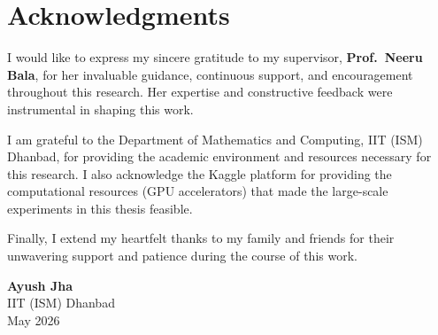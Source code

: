 \documentclass[11pt, a4paper, twoside, openany]{book}
\makeatletter
\def\cleardoublepage{\clearpage\if@twoside \ifodd\c@page\else
    \thispagestyle{empty}
    \hbox{}\newpage\fi\fi}
\makeatother
\begin{document}


\chapter*{Acknowledgments}
I would like to express my sincere gratitude to my supervisor, \textbf{Prof.\ Neeru Bala}, for her invaluable guidance, continuous support, and encouragement throughout this research. Her expertise and constructive feedback were instrumental in shaping this work.

I am grateful to the Department of Mathematics and Computing, IIT (ISM) Dhanbad, for providing the academic environment and resources necessary for this research. I also acknowledge the Kaggle platform for providing the computational resources (GPU accelerators) that made the large-scale experiments in this thesis feasible.

Finally, I extend my heartfelt thanks to my family and friends for their unwavering support and patience during the course of this work.

\vspace{1cm}
\noindent
\textbf{Ayush Jha}\\
IIT (ISM) Dhanbad\\
May 2026

\clearpage


\clearpage
\begingroup
\pagestyle{plain}

{}
\tableofcontents

\makeatletter
\renewcommand{\@mkboth}[2]{}
\makeatother

\setlength{\cftbeforeloftitleskip}{20pt}
\setlength{\cftafterloftitleskip}{20pt}
\setlength{\cftbeforelottitleskip}{20pt}
\setlength{\cftafterlottitleskip}{20pt}

\clearpage
{}
{}
\listoffigures

\clearpage
{}
{}
\listoftables
\endgroup

\pagestyle{fancy}

\let\origcleardoublepage\cleardoublepage
\let\cleardoublepage\clearpage
\mainmatter
\let\cleardoublepage\origcleardoublepage









\end{document}
